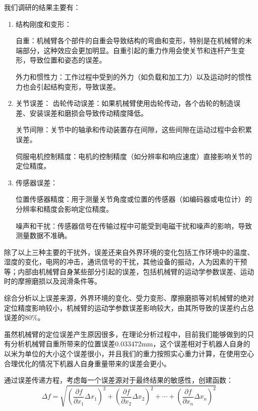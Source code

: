 我们调研的结果主要有：
\begin{enumerate}
    \item 结构刚度和变形：
    
    自重：机械臂各个部件的自重会导致结构的弯曲和变形，特别是在机械臂的末端部分，这种效应会更加明显。自重引起的重力作用会使关节和连杆产生变形，导致位置和姿态的误差。

    外力和惯性力：工作过程中受到的外力（如负载和加工力）以及运动时的惯性力也会引起结构变形，导致误差。

    \item 关节误差：
    齿轮传动误差：如果机械臂使用齿轮传动，各个齿轮的制造误差、安装误差和磨损会导致传动精度降低。

    关节间隙：关节中的轴承和传动装置存在间隙，这些间隙在运动过程中会积累误差。

    伺服电机控制精度：电机的控制精度（如分辨率和响应速度）直接影响关节的定位精度。

    \item 传感器误差：
    
    位置传感器精度：用于测量关节角度或位置的传感器（如编码器或电位计）的分辨率和精度会影响定位精度。

    噪声和干扰：传感器信号在传输过程中可能受到电磁干扰和噪声的影响，导致测量数据不准确。
\end{enumerate}

除了以上三种主要的干扰外，误差还来自外界环境的变化包括工作环境中的温度、湿度的变化，电网的冲击，通讯信号的干扰，其他设备的振动，人为因素的干预等；内部由机械臂自身某些部分引起的误差，包括机械臂的运动学参数误差、运动时的摩擦磨损以及润滑条件等。

综合分析以上误差来源，外界环境的变化、受力变形、摩擦磨损等对机械臂的绝对定位精度影响较小，机械臂的运动学参数误差影响较大，由其所导致的误差约占总误差的80\%。

虽然机械臂的定位误差产生原因很多，在理论分析过程中，目前我们能够做到的只有分析机械臂自重所带来的位置误差0.033472mm，这个误差相对于机器人自身的以米为单位的大小这个误差很小，并且我们的重力按照实心重力计算，在使用空心合理优化的情况下机器人自身重量带来的误差会更小。

通过误差传递方程，考虑每一个误差源对于最终结果的敏感性，创建函数：
\begin{equation}
    \varDelta f=\sqrt{\left( \frac{\partial f}{\partial x_1}\Delta x_1 \right) ^2+\left( \frac{\partial f}{\partial x_2}\Delta x_2 \right) ^2+\cdots +\left( \frac{\partial f}{\partial x_n}\Delta x_n \right) ^2}
\end{equation}

